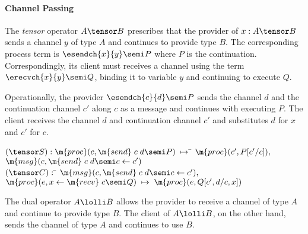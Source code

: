 \paragraph{\textbf{Channel Passing}}
The \emph{tensor} operator $A \tensor B$ prescribes that the provider of
$x : A \tensor B$
sends a channel $y$ of type $A$ and continues to provide type $B$. The
corresponding process term is $\esendch{x}{y} \semi P$ where $P$ is
the continuation.  Correspondingly, its client must receives a channel
using the term $\erecvch{x}{y} \semi Q$, binding it to variable $y$
and continuing to execute $Q$.
Operationally, the provider $\esendch{c}{d} \semi P$ sends the
channel $d$ and the continuation channel $c'$ along $c$ as a message and
continues with executing $P$. The client receives the channel $d$ and continuation
channel $c'$ and substitutes $d$ for $x$ and $c'$ for $c$.
\begin{tabbing}
$({\tensor}S) : \m{proc}(c, \m{send}\; c\; d \semi P) \;\mapsto\; $\=
$\m{proc}(c', P[c'/c]),$\\
\>$\m{msg}(c, \m{send}\; c\; d \semi c \leftarrow c')$ \\
$({\tensor}C) : $ \= $\m{msg}(c, \m{send}\; c\; d \semi c \leftarrow c'),$\\
\>$\m{proc}(e, x \leftarrow \m{recv}\; c \semi Q)
\;\mapsto\; \m{proc}(e, Q[c', d/c, x])$

\end{tabbing}
The dual operator $A \lolli B$ allows the provider to receive a
channel of type $A$ and continue to provide type $B$. The client
of $A \lolli B$, on the other hand, sends the channel of type $A$
and continues to use $B$.

